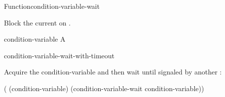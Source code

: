 \documentclass[10pt,twoside,english,pdftex]{article}
\begin{document}
\begin{functiondoc}{Function}{condition-variable-wait}%
  {}
%

\fnsyntax

\fnpurpose Block the current  on .

\fnpackage {}

\fnmodule {}

\fnargs
\begin{args}{condition-variable}
 A 
\end{args}

\fnerrors
\nocvlock{}
\par
\nothreads{}

\begin{alsos}{condition-variable-wait-with-timeout}
\end{alsos}

%
\fnexample Acquire the condition-variable  and then wait until
signaled by another :
%
\W\supp
\begin{example}
  ( (condition-variable)
    (condition-variable-wait condition-variable))
\end{example}

\end{functiondoc}

\end{document}
